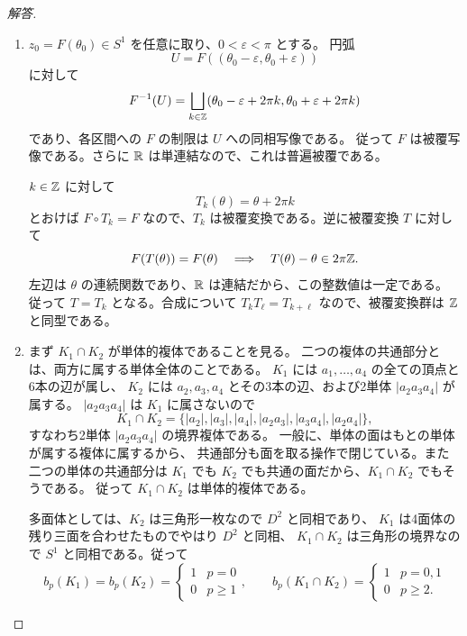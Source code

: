 \begin{proof}[解答]
\begin{enumerate}
\item[(1)] $z_0=F(\theta_0)\in S^1$ を任意に取り、$0<\varepsilon<\pi$ とする。
円弧
\[
U=F((\theta_0-\varepsilon,\theta_0+\varepsilon))
\]
に対して
\[
F^{-1}(U)
=\bigsqcup_{k\in\mathbb{Z}}
(\theta_0-\varepsilon+2\pi k,\theta_0+\varepsilon+2\pi k)
\]
であり、各区間への $F$ の制限は $U$ への同相写像である。
従って $F$ は被覆写像である。さらに $\mathbb{R}$ は単連結なので、これは普遍被覆である。

$k\in\mathbb{Z}$ に対して
\[
T_k(\theta)=\theta+2\pi k
\]
とおけば $F\circ T_k=F$ なので、$T_k$ は被覆変換である。逆に被覆変換 $T$ に対して
\[
F(T(\theta))=F(\theta)
\quad\Longrightarrow\quad
T(\theta)-\theta\in2\pi\mathbb{Z}.
\]
左辺は $\theta$ の連続関数であり、$\mathbb{R}$ は連結だから、この整数値は一定である。
従って $T=T_k$ となる。合成について $T_kT_\ell=T_{k+\ell}$ なので、被覆変換群は $\mathbb{Z}$ と同型である。

\item[(2)] まず $K_1\cap K_2$ が単体的複体であることを見る。
二つの複体の共通部分とは、両方に属する単体全体のことである。
$K_1$ には $a_1,\ldots,a_4$ の全ての頂点と6本の辺が属し、
$K_2$ には $a_2,a_3,a_4$ とその3本の辺、および2単体 $|a_2a_3a_4|$ が属する。
$|a_2a_3a_4|$ は $K_1$ に属さないので
\[
K_1\cap K_2=\{|a_2|,|a_3|,|a_4|,|a_2a_3|,|a_3a_4|,|a_2a_4|\},
\]
すなわち2単体 $|a_2a_3a_4|$ の境界複体である。
一般に、単体の面はもとの単体が属する複体に属するから、
共通部分も面を取る操作で閉じている。また二つの単体の共通部分は
$K_1$ でも $K_2$ でも共通の面だから、$K_1\cap K_2$ でもそうである。
従って $K_1\cap K_2$ は単体的複体である。

多面体としては、$K_2$ は三角形一枚なので $D^2$ と同相であり、
$K_1$ は4面体の残り三面を合わせたものでやはり $D^2$ と同相、
$K_1\cap K_2$ は三角形の境界なので $S^1$ と同相である。従って
\[
b_p(K_1)=b_p(K_2)=
\begin{cases}1&p=0\\0&p\ge1\end{cases},
\qquad
b_p(K_1\cap K_2)=
\begin{cases}1&p=0,1\\0&p\ge2.\end{cases}
\]


\end{enumerate}
\end{proof}
